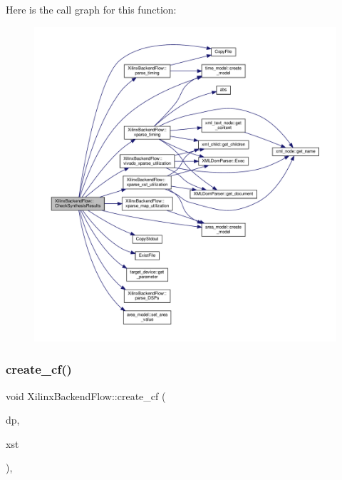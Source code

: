 Here is the call graph for this function\+:
\nopagebreak
\begin{figure}[H]
\begin{center}
\leavevmode
\includegraphics[width=350pt]{d6/d94/classXilinxBackendFlow_a4c059a8e048f5780fa09f00ff7faf817_cgraph}
\end{center}
\end{figure}
\mbox{\label{classXilinxBackendFlow_af8b92a68a04a001e2f4b43fd14dd21b7}} 
\subsubsection{\texorpdfstring{create\+\_\+cf()}{create\_cf()}}
{\footnotesize\ttfamily void Xilinx\+Backend\+Flow\+::create\+\_\+cf (\begin{DoxyParamCaption}\item[{const \hyperlink{DesignParameters_8hpp_ae36bb1c4c9150d0eeecfe1f96f42d157}{Design\+Parameters\+Ref}}]{dp,  }\item[{bool}]{xst }\end{DoxyParamCaption})\hspace{0.3cm}{\ttfamily [protected]}, {\ttfamily [virtual]}}



